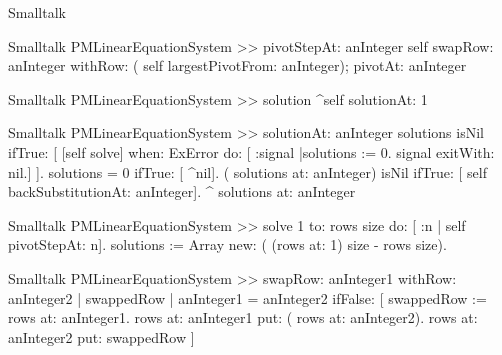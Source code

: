 \begin{displaycode}{Smalltalk}
\begin{displaycode}{Smalltalk}
PMLinearEquationSystem >> pivotStepAt: anInteger
    self swapRow: anInteger withRow: ( self largestPivotFrom: 
                                                           anInteger);
           pivotAt: anInteger
\end{displaycode}


\begin{displaycode}{Smalltalk}
PMLinearEquationSystem >> solution
    ^self solutionAt: 1
\end{displaycode}

\begin{displaycode}{Smalltalk}
PMLinearEquationSystem >> solutionAt: anInteger
    solutions isNil
        ifTrue: [ [self solve] when: ExError do: [ :signal |solutions 
                                       := 0. signal exitWith: nil.] ].
    solutions = 0
        ifTrue: [ ^nil].
    ( solutions at: anInteger) isNil
        ifTrue: [ self backSubstitutionAt: anInteger].
    ^ solutions at: anInteger
\end{displaycode}

\begin{displaycode}{Smalltalk}
PMLinearEquationSystem >> solve
    1 to: rows size do: [ :n | self pivotStepAt: n].
    solutions := Array new: ( (rows at: 1) size - rows size).
\end{displaycode}

\begin{displaycode}{Smalltalk}
PMLinearEquationSystem >> swapRow: anInteger1 withRow: anInteger2
    | swappedRow |
    anInteger1 = anInteger2
        ifFalse: [ swappedRow := rows at: anInteger1.
                      rows at: anInteger1 put: ( rows at: 
                                                          anInteger2).
                      rows at: anInteger2 put: swappedRow ]
\end{displaycode}


\end{displaycode}

